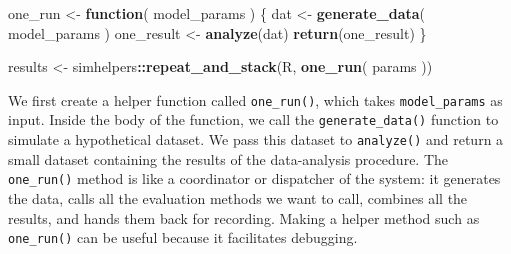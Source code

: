 \documentclass[
]{book}
\newenvironment{Shaded}{\begin{snugshade}}{\end{snugshade}}
\newcommand{\ControlFlowTok}[1]{\textcolor[rgb]{0.13,0.29,0.53}{\textbf{#1}}}
\newcommand{\FunctionTok}[1]{\textcolor[rgb]{0.13,0.29,0.53}{\textbf{#1}}}
\newcommand{\NormalTok}[1]{#1}
\newcommand{\OtherTok}[1]{\textcolor[rgb]{0.56,0.35,0.01}{#1}}
\newcommand{\SpecialCharTok}[1]{\textcolor[rgb]{0.81,0.36,0.00}{\textbf{#1}}}
\begin{document}
\begin{Shaded}
\begin{Highlighting}[]
\NormalTok{one\_run }\OtherTok{\textless{}{-}} \ControlFlowTok{function}\NormalTok{( model\_params ) \{}
\NormalTok{  dat }\OtherTok{\textless{}{-}} \FunctionTok{generate\_data}\NormalTok{( model\_params )}
\NormalTok{  one\_result }\OtherTok{\textless{}{-}} \FunctionTok{analyze}\NormalTok{(dat)}
  \FunctionTok{return}\NormalTok{(one\_result)}
\NormalTok{\}}

\NormalTok{results }\OtherTok{\textless{}{-}}\NormalTok{ simhelpers}\SpecialCharTok{::}\FunctionTok{repeat\_and\_stack}\NormalTok{(R, }\FunctionTok{one\_run}\NormalTok{( params ))}
\end{Highlighting}
\end{Shaded}

We first create a helper function called \texttt{one\_run()}, which takes \texttt{model\_params} as input.
Inside the body of the function, we call the \texttt{generate\_data()} function to simulate a hypothetical dataset.
We pass this dataset to \texttt{analyze()} and return a small dataset containing the results of the data-analysis procedure.
The \texttt{one\_run()} method is like a coordinator or dispatcher of the system: it generates the data, calls all the evaluation methods we want to call, combines all the results, and hands them back for recording.
Making a helper method such as \texttt{one\_run()} can be useful because it facilitates debugging.
\end{document}
